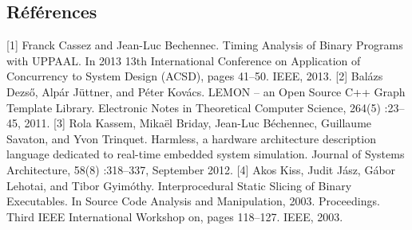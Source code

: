 \documentclass[final]{beamer}
\begin{document}
\begin{frame}
    
    
      \subsection{Références}
      
      \small
      
      {\color{skyblue2} [1]} Franck Cassez and Jean-Luc Bechennec. Timing Analysis of
      Binary Programs with UPPAAL. In 2013 13th International Conference on Application of
      Concurrency to System Design (ACSD), pages 41–50. IEEE, 2013. {\color{skyblue2}
        [2]} Balázs Dezső, Alpár Jüttner, and Péter Kovács. LEMON – an Open Source C++
      Graph Template Library. Electronic Notes in Theoretical Computer Science, 264(5)
      :23–45, 2011. {\color{skyblue2} [3]} Rola Kassem, Mikaël Briday, Jean-Luc
      Béchennec, Guillaume Savaton, and Yvon Trinquet. Harmless, a hardware architecture
      description language dedicated to real-time embedded system simulation. Journal of
      Systems Architecture, 58(8) :318–337, September 2012. {\color{skyblue2} [4]} Akos
      Kiss, Judit Jász, Gábor Lehotai, and Tibor Gyimóthy.  Interprocedural Static Slicing
      of Binary Executables. In Source Code Analysis and Manipulation,
      2003. Proceedings. Third IEEE International Workshop on, pages 118–127. IEEE, 2003.
      
  \end{frame}
\end{document}
